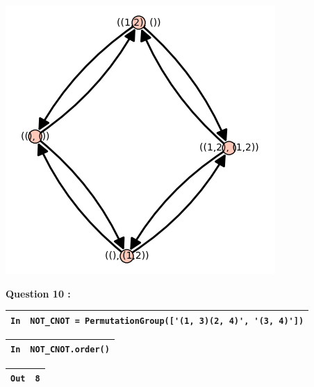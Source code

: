 \documentclass[titlepage]{article}
\begin{document}
    \begin{center}
        \includegraphics[scale=0.5]{q92.png}
    \end{center}

    \textbf{Question 10 :}

    \begin{tabularx}{11.5cm}{|p{0.60cm}|X|}
        \hline
        \verb|In|
        & 
        \verb|NOT_CNOT = PermutationGroup(['(1, 3)(2, 4)', '(3, 4)'])|
        \\
        \hline
    \end{tabularx}\newline
    \begin{tabularx}{11.5cm}{|p{0.60cm}|X|}
        \hline
        \verb|In|
        & 
        \verb|NOT_CNOT.order()|
        \\
        \hline
    \end{tabularx}\newline
    \begin{tabularx}{11.5cm}{|p{0.60cm}|X|}
        \hline
        \verb|Out|
        & 
        \verb|8|
        \\
        \hline
    \end{tabularx}\newline
    
\end{document}
